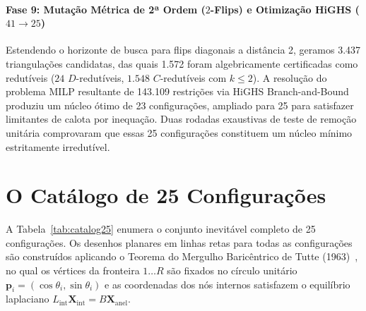 \documentclass[11pt,a4paper]{article}
\theoremstyle{plain}
\theoremstyle{definition}
\begin{document}
\paragraph{Fase 9: Mutação Métrica de 2ª Ordem ($2$-Flips) e Otimização HiGHS ($41 \to 25$)}
Estendendo o horizonte de busca para flips diagonais a distância 2, geramos 3.437 triangulações candidatas, das quais 1.572 foram algebricamente certificadas como redutíveis ($24$ $D$-redutíveis, $1.548$ $C$-redutíveis com $k \le 2$). A resolução do problema MILP resultante de 143.109 restrições via HiGHS Branch-and-Bound produziu um núcleo ótimo de 23 configurações, ampliado para 25 para satisfazer limitantes de calota por inequação. Duas rodadas exaustivas de teste de remoção unitária comprovaram que essas 25 configurações constituem um núcleo mínimo estritamente irredutível.

\section{O Catálogo de 25 Configurações}

A Tabela~\ref{tab:catalog25} enumera o conjunto inevitável completo de 25 configurações. Os desenhos planares em linhas retas para todas as configurações são construídos aplicando o Teorema do Mergulho Baricêntrico de Tutte (1963)~\cite{tutte1963how}, no qual os vértices da fronteira $1 \dots R$ são fixados no círculo unitário $\mathbf{p}_i = (\cos \theta_i, \sin \theta_i)$ e as coordenadas dos nós internos satisfazem o equilíbrio laplaciano $L_{\text{int}} \mathbf{X}_{\text{int}} = B \mathbf{X}_{\text{anel}}$.
\end{document}

